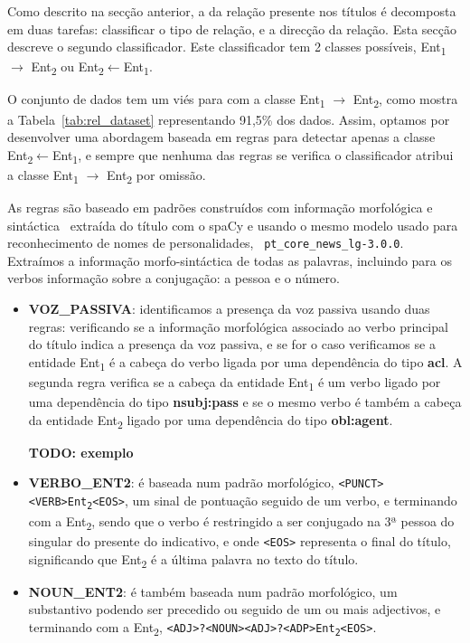 \documentclass[a4paper, twocolumn, 11pt, twoside]{article}
\begin{document}
Como descrito na secção anterior, a da relação presente nos títulos é decomposta em duas tarefas: classificar o tipo de relação, e a direcção da relação. Esta secção descreve o segundo classificador. Este classificador tem 2 classes possíveis, Ent\textsubscript{1} $\rightarrow$ Ent\textsubscript{2} ou Ent\textsubscript{2}$\leftarrow$Ent\textsubscript{1}.

O conjunto de dados tem um viés para com a classe Ent\textsubscript{1} $\rightarrow$ Ent\textsubscript{2}, como mostra a Tabela~\ref{tab:rel_dataset} representando 91,5\% dos dados. Assim, optamos por desenvolver uma abordagem baseada em regras para detectar apenas a classe Ent\textsubscript{2}$\leftarrow$Ent\textsubscript{1}, e sempre que nenhuma das regras se verifica o classificador atribui a classe Ent\textsubscript{1} $\rightarrow$ Ent\textsubscript{2} por omissão.

As regras são baseado em padrões construídos com informação morfológica e sintáctica~\citep{nivre-etal-2020-universal} extraída do título com o spaCy e usando o mesmo modelo usado para reconhecimento de nomes de personalidades, ~\texttt{pt\_core\_news\_lg-3.0.0}. Extraímos a informação morfo-sintáctica de todas as palavras, incluindo para os verbos informação sobre a conjugação: a pessoa e o número.

\begin{itemize}

\item \textbf{VOZ\_PASSIVA}: identificamos a presença da voz passiva usando duas regras: verificando se a informação morfológica associado ao verbo principal do título indica a presença da voz passiva, e se for o caso verificamos se a entidade Ent\textsubscript{1} é a cabeça do verbo ligada por uma dependência do tipo \textbf{acl}. A segunda regra verifica se a cabeça da entidade Ent\textsubscript{1} é um verbo ligado por uma dependência do tipo \textbf{nsubj:pass} e se o mesmo verbo é também a cabeça da entidade Ent\textsubscript{2} ligado por uma dependência do tipo \textbf{obl:agent}.

\textbf{TODO: exemplo}


\item \textbf{VERBO\_ENT2}: é baseada num padrão morfológico, \texttt{<PUNCT><VERB>Ent\textsubscript{2}<EOS>}, um sinal de pontuação seguido de um verbo, e terminando com a Ent\textsubscript{2}, sendo que o verbo é restringido a ser conjugado na 3ª pessoa do singular do presente do indicativo, e onde \texttt{<EOS>} representa o final do título, significando que Ent\textsubscript{2} é a última palavra no texto do título.

\item \textbf{NOUN\_ENT2}: é também baseada num padrão morfológico, um substantivo podendo ser precedido ou seguido de um ou mais adjectivos, e terminando com a Ent\textsubscript{2}, \texttt{<ADJ>?<NOUN><ADJ>?<ADP>Ent\textsubscript{2}<EOS>}.

\end{itemize}
\end{document}
